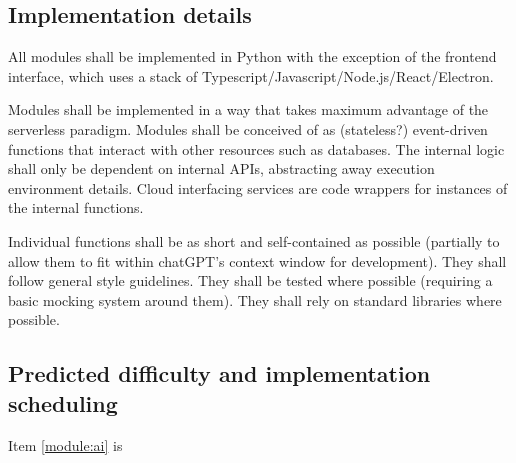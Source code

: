 \documentclass[12pt]{article}
\begin{document}
\subsection{Implementation details}
All modules shall be implemented in Python with the exception of the frontend interface, which uses a stack of Typescript/Javascript/Node.js/React/Electron. 

Modules shall be implemented in a way that takes maximum advantage of the serverless paradigm. Modules shall be conceived of as (stateless?) event-driven functions that interact with other resources such as databases. The internal logic shall only be dependent on internal APIs, abstracting away execution environment details. Cloud interfacing services are code wrappers for instances of the internal functions.

Individual functions shall be as short and self-contained as possible (partially to allow them to fit within chatGPT's context window for development). They shall follow general style guidelines. They shall be tested where possible (requiring a basic mocking system around them). They shall rely on standard libraries where possible.

\subsection{Predicted difficulty and implementation scheduling}

Item \ref{module:ai} is
\end{document}
